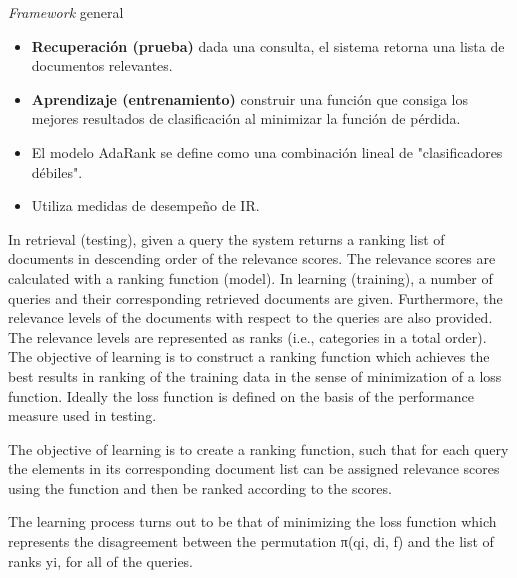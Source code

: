 \documentclass{beamer}
\begin{document}
\begin{frame}{\textit{Framework} general}
    \begin{itemize}%
        \item \textbf{Recuperación (prueba)} dada una consulta, el sistema retorna una lista de documentos relevantes.
        \item \textbf{Aprendizaje (entrenamiento)} construir una función que consiga los mejores resultados de clasificación al minimizar la función de pérdida.
        \item El modelo AdaRank se define como una combinación lineal de "clasificadores débiles".
        \item Utiliza medidas de desempeño de IR.
    \end{itemize}

    \begin{note}
        {In retrieval (testing), given a query the system returns a ranking list of documents in descending order of the relevance scores. The relevance scores are calculated with a ranking function (model). In learning (training), a number of queries and their corresponding retrieved documents are given. Furthermore, the relevance levels of the documents with respect to the queries are also provided. The relevance levels are represented as ranks (i.e., categories in a total order). The objective of learning is to construct a ranking function which achieves the best results in ranking of the training data in the sense of minimization of a loss function. Ideally the loss function is defined on the basis of the performance measure used in testing.

        The objective of learning is to create a ranking function, such that for each query the elements in its corresponding document list can be assigned relevance scores using the function and then be ranked according to the scores.

        The learning process turns out to be that of minimizing the loss function which represents the disagreement between the permutation π(qi, di, f) and the list of ranks yi, for all of the queries.}
    \end{note}
\end{frame}
\end{document}
